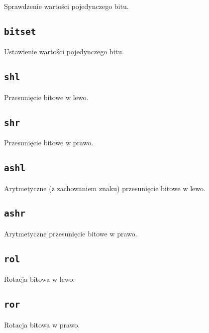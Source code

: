 Sprawdzenie wartości pojedynczego bitu.

\subsection{\texttt{bitset}}

Ustawienie wartości pojedynczego bitu.

\subsection{\texttt{shl}}

Przesunięcie bitowe w lewo.

\subsection{\texttt{shr}}

Przesunięcie bitowe w prawo.

\subsection{\texttt{ashl}}

Arytmetyczne (z zachowaniem znaku) przesunięcie bitowe w lewo.

\subsection{\texttt{ashr}}

Arytmetyczne przesunięcie bitowe w prawo.

\subsection{\texttt{rol}}

Rotacja bitowa w lewo.

\subsection{\texttt{ror}}

Rotacja bitowa w prawo.
